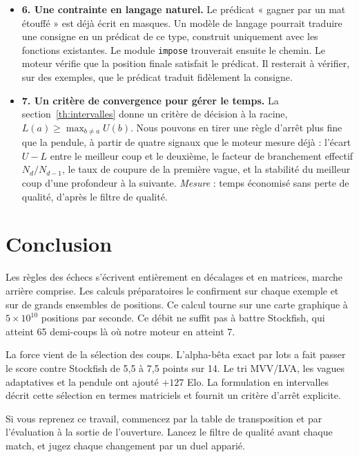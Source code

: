 \documentclass[11pt,a4paper]{article}
\newcommand{\code}[1]{\texttt{#1}}
\newcounter{calcul}
\theoremstyle{plain}
\begin{document}
\begin{itemize}[itemsep=6pt]
\item \textbf{6. Une contrainte en langage naturel.} Le prédicat « gagner par un mat étouffé » est
déjà écrit en masques. Un modèle de langage pourrait traduire une consigne en un prédicat de ce
type, construit uniquement avec les fonctions existantes. Le module \code{impose} trouverait
ensuite le chemin. Le moteur vérifie que la position finale satisfait le prédicat. Il resterait à
vérifier, sur des exemples, que le prédicat traduit fidèlement la consigne.

\item \textbf{7. Un critère de convergence pour gérer le temps.} La
section~\ref{th:intervalles} donne un critère de décision à la racine,
$L(a) \ge \max_{b\ne a} U(b)$. Nous pouvons en tirer une règle d'arrêt plus fine que la pendule,
à partir de quatre signaux que le moteur mesure déjà : l'écart $U - L$ entre le meilleur coup et
le deuxième, le facteur de branchement effectif $N_d / N_{d-1}$, le taux de coupure de la
première vague, et la stabilité du meilleur coup d'une profondeur à la suivante. \emph{Mesure} :
temps économisé sans perte de qualité, d'après le filtre de qualité.
\end{itemize}

\section{Conclusion}
Les règles des échecs s'écrivent entièrement en décalages et en matrices, marche arrière comprise.
Les calculs préparatoires le confirment sur chaque exemple et sur de grands ensembles de
positions. Ce calcul tourne sur une carte graphique à $5\times10^{10}$ positions par seconde. Ce
débit ne suffit pas à battre Stockfish, qui atteint 65 demi-coups là où notre moteur en atteint 7.

La force vient de la sélection des coups. L'alpha-bêta exact par lots a fait passer le score
contre Stockfish de 5,5 à 7,5 points sur 14. Le tri MVV/LVA, les vagues adaptatives et la pendule
ont ajouté $+127$ Elo. La formulation en intervalles décrit cette sélection en termes matriciels
et fournit un critère d'arrêt explicite.

Si vous reprenez ce travail, commencez par la table de transposition et par l'évaluation à la
sortie de l'ouverture. Lancez le filtre de qualité avant chaque match, et jugez chaque changement
par un duel apparié.
\end{document}
